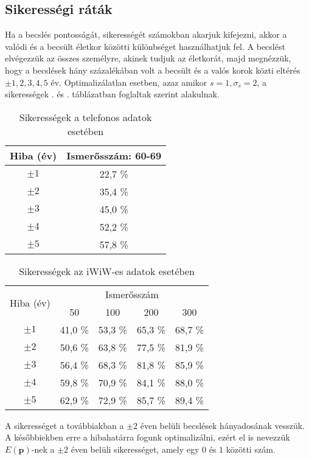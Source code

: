 \documentclass[12pt]{article}
\begin{document}
\subsection{Sikerességi ráták}
Ha a becslés pontosságát, sikerességét számokban akarjuk kifejezni, akkor a valódi és a becsült életkor közötti különbséget használhatjuk fel. A becslést elvégezzük az összes személyre, akinek tudjuk az életkorát, majd megnézzük, hogy a becslések hány százalékában volt a becsült és a valós korok közti eltérés $\pm 1, 2,3,4,5$ év. Optimalizálatlan esetben, azaz amikor $s = 1, \sigma_s = 2$, a sikerességek . és . táblázatban foglaltak szerint alakulnak.
\begin{table}[H]
	\centering
	\begin{tabular}{|c|c|}
		\hline
		Hiba (év) & Ismerősszám: 60-69 \\
		\hline
		$\pm 1$ & 22,7 \% \\
		\hline
		$\pm 2$ & 35,4 \% \\
		\hline
		$\pm 3$ & 45,0 \% \\
		\hline
		$\pm 4$ & 52,2 \% \\
		\hline
		$\pm 5$ & 57,8 \% \\
		\hline
	\end{tabular}
	\caption{Sikerességek a telefonos adatok esetében}
	\label{telefon_sikeresseg_nemopt} %
\end{table}
\begin{table}[H]
	\centering
	\begin{tabular}{|c|c|c|c|c|}
		\hline
		\multirow{2}{*}{Hiba (év)} & \multicolumn{4}{|c|}{Ismerősszám} \\ \cline{2-5} & 50 & 100 & 200 & 300 \\
		\hline
		$\pm 1$ & 41,0 \% & 53,3 \% & 65,3 \% & 68,7 \% \\
		\hline
		$\pm 2$ & 50,6 \% & 63,8 \% & 77,5 \% & 81,9 \% \\
		\hline
		$\pm 3$ & 56,4 \% & 68,3 \% & 81,8 \% & 85,9 \% \\
		\hline
		$\pm 4$ & 59,8 \% & 70,9 \% & 84,1 \% & 88,0 \% \\
		\hline
		$\pm 5$ & 62,9 \% & 72,9 \% & 85,7 \% & 89,4 \% \\
		\hline
	\end{tabular}
	\caption{Sikerességek az iWiW-es adatok esetében}
	\label{iwiw_sikeresseg_nemopt}
\end{table}
A sikerességet a továbbiakban a $\pm 2$ éven belüli becslések hányadosának vesszük. %
A későbbiekben erre a hibahatárra fogunk optimalizálni, ezért el is nevezzük $E(\mathbf{p})$-nek a $\pm 2$ éven belüli sikerességet, amely egy $0$ és $1$ közötti szám.
\end{document}
